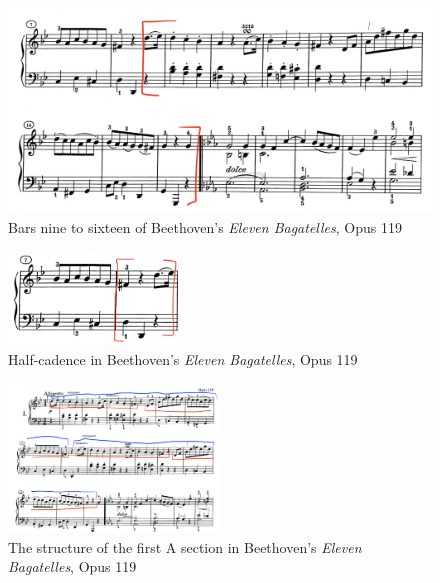 \begin{figure}
  \centering
  \includegraphics[width=\textwidth]{figures/beethoven-first-a-section-bars-nine-to-sixteen.jpg}
  \caption{Bars nine to sixteen of Beethoven's \textit{Eleven Bagatelles}, Opus 119}
  \label{fig:beethoven-first-a-section-bars-nine-to-sixteen}
\end{figure}

\begin{figure}
	\centering
	\includegraphics[width=0.4\textwidth]{figures/beethoven-first-a-section-hc.jpg}
	\caption{Half-cadence in Beethoven's \textit{Eleven Bagatelles}, Opus 119}
	\label{fig:beethoven-first-a-section-hc}
\end{figure}

\begin{figure}
	\centering
	\includegraphics[width=0.5\textwidth]{figures/beethoven-first-a-section-structure.jpg}
	\caption{The structure of the first A section in Beethoven's \textit{Eleven Bagatelles}, Opus 119}
	\label{fig:beethoven-first-a-section-structure}
\end{figure}


